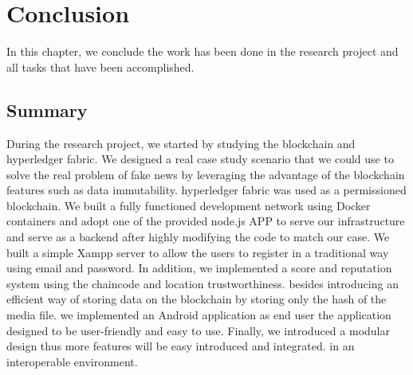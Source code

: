 \chapter*{Conclusion}

In this chapter, we conclude the work has been done in the research project and all tasks that have been accomplished.

\section{Summary}
During the research project, we started by studying the blockchain and hyperledger fabric. We designed a real case study scenario that we could use to solve the real problem of fake news by leveraging the advantage of the blockchain features such as data immutability.
hyperledger fabric was used as a permissioned blockchain. We built a fully functioned development network using Docker containers and adopt one of the provided node.js APP to serve our infrastructure and serve as a backend after highly modifying the code to match our case. 
We built a simple Xampp server to allow the users to register in a traditional way using email and password.  
In addition, we implemented a score and reputation system using the chaincode and location trustworthiness. besides introducing an efficient way of storing data on the blockchain by storing only the hash of the media file. we implemented an Android application as end user the application designed to be user-friendly and easy to use. Finally, we introduced a modular design thus more features will be easy introduced and integrated. in an interoperable environment.
